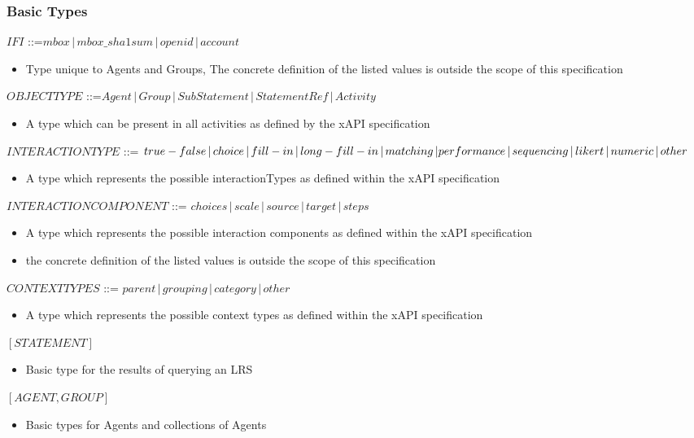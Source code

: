 \documentclass{article}
\begin{document}
  \subsubsection{Basic Types}
  $IFI$ ::=$ mbox \,|\, mbox\_sha1sum \,|\, openid \,|\, account$
  \begin{itemize}
  \item Type unique to Agents and Groups, The concrete definition of the listed values
    is outside the scope of this specification
  \end{itemize}
  $OBJECTTYPE$ ::=$ Agent \,|\, Group \,|\, SubStatement \,|\,
  StatementRef \,|\, Activity$
  \begin{itemize}
  \item A type which can be present in all activities as defined by
    the xAPI specification
  \end{itemize}
  $INTERACTIONTYPE$ ::= $true-false \,|\, choice \,|\, fill-in \,|\,
  long-fill-in \,|\, matching \,| \\ performance \,|\, sequencing \,|\,
  likert \,|\, numeric \,|\, other$
  \begin{itemize}
  \item A type which represents the possible interactionTypes as
      defined within the xAPI specification
  \end{itemize}
  $INTERACTIONCOMPONENT$ ::= $choices \,|\, scale \,|\, source \,|\,
  target \,|\, steps$
  \begin{itemize}
  \item A type which represents the possible interaction components as
    defined within the xAPI specification
  \item the concrete definition of the listed values is outside the
    scope of this specification
  \end{itemize}
  $CONTEXTTYPES$ ::= $parent \,|\, grouping \,|\, category \,|\, other$
  \begin{itemize}
  \item A type which represents the possible context types as
    defined within the xAPI specification
  \end{itemize}
  $[STATEMENT]$
  \begin{itemize}
  \item Basic type for the results of querying an LRS
  \end{itemize}
  $[AGENT, GROUP]$
  \begin{itemize}
  \item Basic types for Agents and collections of Agents
  \end{itemize}
\end{document}
